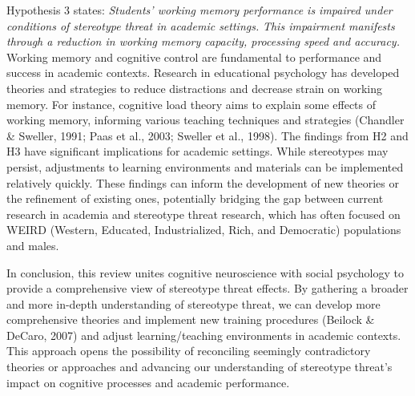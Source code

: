 \documentclass[
  stu, a4paper,floatsintext]{apa7}
\begin{document}
Hypothesis 3 states: \emph{Students' working memory performance is impaired under conditions of stereotype threat in academic settings.}
\emph{This impairment manifests through a reduction in working memory capacity, processing speed and accuracy.}\\
Working memory and cognitive control are fundamental to performance and success in academic contexts. Research in educational psychology has developed theories and strategies to reduce distractions and decrease strain on working memory.
For instance, cognitive load theory aims to explain some effects of working memory, informing various teaching techniques and strategies (Chandler \& Sweller, 1991; Paas et al., 2003; Sweller et al., 1998).
The findings from H2 and H3 have significant implications for academic settings.
While stereotypes may persist, adjustments to learning environments and materials can be implemented relatively quickly.
These findings can inform the development of new theories or the refinement of existing ones, potentially bridging the gap between current research in academia and stereotype threat research, which has often focused on WEIRD (Western, Educated, Industrialized, Rich, and Democratic) populations and males.

In conclusion, this review unites cognitive neuroscience with social psychology to provide a comprehensive view of stereotype threat effects. By gathering a broader and more in-depth understanding of stereotype threat, we can develop more comprehensive theories and implement new training procedures (Beilock \& DeCaro, 2007) and adjust learning/teaching environments in academic contexts.
This approach opens the possibility of reconciling seemingly contradictory theories or approaches and advancing our understanding of stereotype threat's impact on cognitive processes and academic performance.
\end{document}

